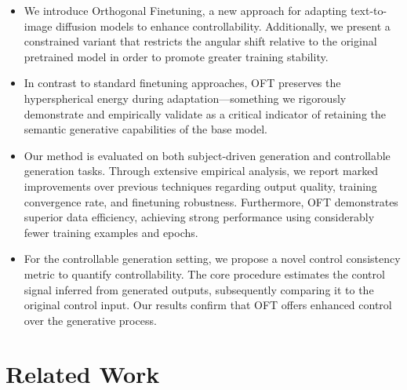 \begin{itemize}[leftmargin=*,nosep]

    \item We introduce Orthogonal Finetuning, a new approach for adapting text-to-image diffusion models to enhance controllability. Additionally, we present a constrained variant that restricts the angular shift relative to the original pretrained model in order to promote greater training stability.
    \item In contrast to standard finetuning approaches, OFT preserves the hyperspherical energy during adaptation—something we rigorously demonstrate and empirically validate as a critical indicator of retaining the semantic generative capabilities of the base model.
    \item Our method is evaluated on both subject-driven generation and controllable generation tasks. Through extensive empirical analysis, we report marked improvements over previous techniques regarding output quality, training convergence rate, and finetuning robustness. Furthermore, OFT demonstrates superior data efficiency, achieving strong performance using considerably fewer training examples and epochs.
    \item For the controllable generation setting, we propose a novel control consistency metric to quantify controllability. The core procedure estimates the control signal inferred from generated outputs, subsequently comparing it to the original control input. Our results confirm that OFT offers enhanced control over the generative process.
\end{itemize}

\section{Related Work}

